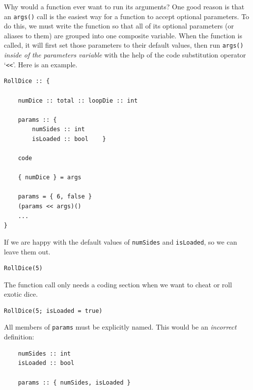 \documentclass{article}
\newenvironment{code}{
       \begin{list}{}{
               \setlength{\leftmargin}{.4in}
               \setlength{\rightmargin}{0in}
               \setlength{\topsep}{.2in}
       }
       \small
       \item[] }
       { \end{list}   }
\begin{document}
Why would a function ever want to run its arguments?  One good reason is that an \verb#args()# call is the easiest way for a function to accept optional parameters.  To do this, we must write the function so that all of its optional parameters (or aliases to them) are grouped into one composite variable.  When the function is called, it will first set those parameters to their default values, then run \verb#args()# \emph{inside of the parameters variable} with the help of the code substitution operator `\verb#<<#'.  Here is an example.

\begin{code} \begin{verbatim}
RollDice :: {
    
    numDice :: total :: loopDie :: int
    
    params :: {
        numSides :: int
        isLoaded :: bool    }
    
    code
    
    { numDice } = args
    
    params = { 6, false }
    (params << args)()
    ...
}
\end{verbatim} \end{code}

\noindent If we are happy with the default values of \verb#numSides# and \verb#isLoaded#, so we can leave them out.

\begin{code} \begin{verbatim}
RollDice(5)
\end{verbatim} \end{code}

\noindent The function call only needs a coding section when we want to cheat or roll exotic dice.

\begin{code} \begin{verbatim}
RollDice(5; isLoaded = true)
\end{verbatim} \end{code}

All members of \verb#params# must be explicitly named.  This would be an \emph{incorrect} definition:

\begin{code} \begin{verbatim}
    numSides :: int
    isLoaded :: bool
    
    params :: { numSides, isLoaded }
\end{verbatim} \end{code}
\end{document}
